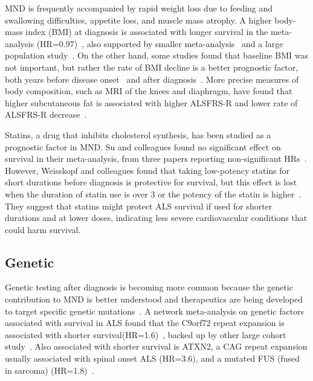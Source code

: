 MND is frequently accompanied by rapid weight loss due to feeding and swallowing difficulties, appetite loss, and muscle mass atrophy.
A higher body-mass index (BMI) at diagnosis is associated with longer survival in the meta-analysis (HR=0.97)~\cite{suPredictorsSurvivalPatients2021}, also supported by smaller meta-analysis~\cite{dardiotisBodyMassIndex2018} and a large population study~\cite{gaoEpidemiologyFactorsPredicting2021}.
On the other hand, some studies found that baseline BMI was not important, but rather the rate of BMI decline is a better prognostic factor, both years before disease onset~\cite{goutmanBodyMassIndex2023} and after diagnosis~\cite{jawaidDecreaseBodyMass2010}.
More precise measures of body composition, such as MRI of the knees and diaphragm, have found that higher subcutaneous fat is associated with higher ALSFRS-R and lower rate of ALSFRS-R decrease~\cite{lindauerAdiposeTissueDistribution2013}.

Statins, a drug that inhibits cholesterol synthesis, has been studied as a prognostic factor in MND.
Su and colleagues found no significant effect on survival in their meta-analysis, from three papers reporting non-significant HRs~\cite{suPredictorsSurvivalPatients2021}.
However, Weisskopf and colleagues found that taking low-potency statins for short durations before diagnosis is protective for survival, but this effect is lost when the duration of statin use is over 3 or the potency of the statin is higher~\cite{weisskopfStatinMedicationsAmyotrophic2022}.
They suggest that statins might protect ALS survival if used for shorter durations and at lower doses, indicating less severe cardiovascular conditions that could harm survival.


\subsection{Genetic}

Genetic testing after diagnosis is becoming more common because the genetic contribution to MND is better understood and  therapeutics are being developed to target specific genetic mutations~\cite{efnstaskforceondiagnosisandmanagementofamyotrophiclateralsclerosis:EFNSGuidelinesClinical2012}.
A network meta-analysis on genetic factors associated with survival in ALS found that the C9orf72 repeat expansion is associated with shorter survival(HR=1.6)~\cite{suGeneticFactorsSurvival2022}, backed up by other large cohort study~\cite{chioAssociationCopresencePathogenic2023}.
Also associated with shorter survival is ATXN2, a CAG repeat expansion usually associated with spinal onset ALS (HR=3.6), and a mutated FUS (fused in sarcoma) (HR=1.8)~\cite{suGeneticFactorsSurvival2022}.

